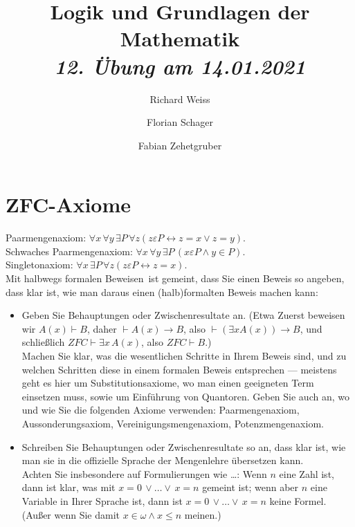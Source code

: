 \documentclass{article}
\title
{
  Logik und Grundlagen der Mathematik \\
  \vspace{4pt}
  \normalsize
  \textit{12. Übung am 14.01.2021}
}
\author
{
  Richard Weiss
  \and
  Florian Schager
  \and
  Fabian Zehetgruber
}
\date{}
\begin{document}
\maketitle

\section*{ZFC-Axiome}

Paarmengenaxiom: $\forall x\, \forall y\, \exists P \, \forall z
(z \varepsilon P \leftrightarrow z = x \lor z = y)$. \\
Schwaches Paarmengenaxiom: $\forall x\, \forall y\, \exists P\, (x \varepsilon P \land y \in P)$. \\
Singletonaxiom: $\forall x \, \exists P \, \forall z (z \varepsilon P \leftrightarrow z = x)$. \\
Mit \glqq halbwegs formalen Beweisen\grqq\ ist gemeint, dass Sie einen Beweis so
angeben, dass klar ist, wie man daraus einen (halb)formalten Beweis machen kann:
\begin{itemize}
  \item Geben Sie Behauptungen oder Zwischenresultate an. (Etwa \glqq Zuerst beweisen
  wir $A(x) \vdash B$, daher $\vdash A(x) \rightarrow B$, also $\vdash (\exists x A(x)) \rightarrow B$,
  und schließlich $ZFC \vdash \exists x \, A(x)$, also $ZFC \vdash B$.\grqq) \\
  Machen Sie klar, was die wesentlichen Schritte in Ihrem Beweis sind, und zu
  welchen Schritten diese in einem formalen Beweis entsprechen --- meistens
  geht es hier um Substitutionsaxiome, wo man einen geeigneten Term einsetzen muss,
  sowie um Einführung von Quantoren. Geben Sie auch an, wo und wie Sie die folgenden
  Axiome verwenden: Paarmengenaxiom, Aussonderungsaxiom, Vereinigungsmengenaxiom,
  Potenzmengenaxiom.
  \item Schreiben Sie Behauptungen oder Zwischenresultate so an, dass klar ist,
  wie man sie in die offizielle Sprache der Mengenlehre übersetzen kann. \\
  Achten Sie insbesondere auf Formulierungen wie \glqq\dots\grqq: Wenn $n$ eine
  Zahl ist, dann ist klar, was mit $x = 0\, \lor \dots \lor\, x = n$ gemeint ist;
  wenn aber $n$ eine Variable in Ihrer Sprache ist, dann ist $x = 0\, \lor \dots \lor\, x = n$
  keine Formel. (Außer wenn Sie damit $x \in \omega \land x \leq n$ meinen.)
\end{itemize}





\end{document}
